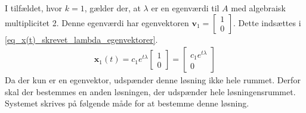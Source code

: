 \begin{bev}
\begin{itemize}
    I tilfældet, hvor $k=1$, gælder der, at $\lambda$ er en egenværdi til $A$ med algebraisk multiplicitet 2. Denne egenværdi har egenvektoren $\textbf{v}_1 = \begin{bmatrix} 1\\0\end{bmatrix}$. Dette indsættes i \eqref{eq_x(t)_skrevet_lambda_egenvektorer}. 
    \begin{align*}
        \textbf{x}_1(t) = c_1e^{t\lambda} \begin{bmatrix} 1\\0\end{bmatrix} = \begin{bmatrix} c_1e^{t\lambda}\\0\end{bmatrix}
    \end{align*}
    Da der kun er en egenvektor, udspænder denne løsning ikke hele rummet. Derfor skal der bestemmes en anden løsningen, der udspænder hele løsningensrummet. Systemet skrives på følgende måde for at bestemme denne løsning.
    

\end{itemize}
\end{bev}
